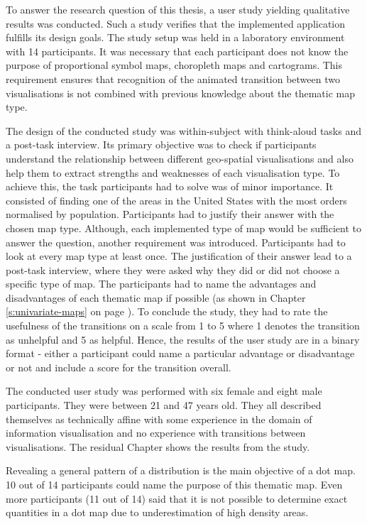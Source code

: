 To answer the research question of this thesis, a user study yielding qualitative results was conducted. Such a study verifies that the implemented application fulfills its design goals.
The study setup was held in a laboratory environment with 14 participants. It was necessary that each participant does not know the purpose of proportional symbol maps, choropleth maps and cartograms. This requirement ensures that recognition of the animated transition between two visualisations is not combined with previous knowledge about the thematic map type.

The design of the conducted study was within-subject with think-aloud tasks and a post-task interview. Its primary objective was to check if participants understand the relationship between different geo-spatial visualisations and also help them to extract strengths and weaknesses of each visualisation type. To achieve this, the task participants had to solve was of minor importance. It consisted of finding one of the areas in the United States with the most orders normalised by population. Participants had to justify their answer with the chosen map type. Although, each implemented type of map would be sufficient to answer the question, another requirement was introduced. Participants had to look at every map type at least once. The justification of their answer lead to a post-task interview, where they were asked why they did or did not choose a specific type of map. The participants had to name the advantages and disadvantages of each thematic map if possible (as shown in Chapter \ref{s:univariate-maps} on page \pageref{s:univariate-maps}).
To conclude the study, they had to rate the usefulness of the transitions on a scale from 1 to 5 where 1 denotes the transition as unhelpful and 5 as helpful. Hence, the results of the user study are in a binary format - either a participant could name a particular advantage or disadvantage or not and include a score for the transition overall.

The conducted user study was performed with six female and eight male participants. They were between 21 and 47 years old. They all described themselves as technically affine with some experience in the domain of information visualisation and no experience with transitions between visualisations. The residual Chapter shows the results from the study.

Revealing a general pattern of a distribution is the main objective of a dot map. 10 out of 14 participants could name the purpose of this thematic map. Even more participants (11 out of 14) said that it is not possible to determine exact quantities in a dot map due to underestimation of high density areas.

